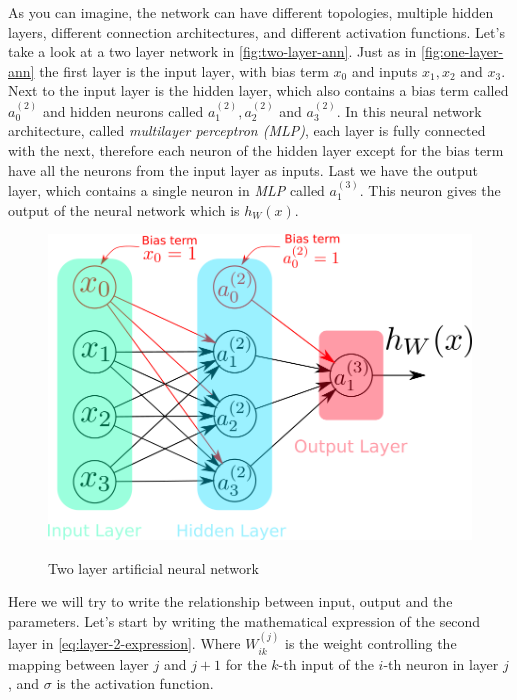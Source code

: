 As you can imagine, the network can have different topologies,
multiple hidden layers, different connection architectures, and
different activation functions. Let's take a look at a two layer
network in \autoref{fig:two-layer-ann}. Just as in
\autoref{fig:one-layer-ann} the first layer is the input layer, with
bias term $x_0$ and inputs $x_1, x_2$ and $x_3$. Next to the input
layer is the hidden layer, which also contains a bias term called
$a_0^{(2)}$ and hidden neurons called $a_1^{(2)}, a_2^{(2)}$ and
$a_3^{(2)}$. In this neural network architecture, called
\textit{multilayer perceptron (MLP)}, each layer is fully connected
with the next, therefore each neuron of the hidden layer except for
the bias term have all the neurons from the input layer as inputs.
Last we have the output layer, which contains a single neuron in
\textit{MLP} called $a_1^{(3)}$. This neuron gives the output of the
neural network which is $h_{W}(x)$.

\begin{figure}[bth]
  \myfloatalign
  {\includegraphics[width=1\linewidth]
    {gfx/two-layer-ann-model}}
  \caption{Two layer artificial neural network}
  \label{fig:two-layer-ann}
\end{figure}

Here we will try to write the relationship between input, output and
the parameters. Let's start by writing the mathematical expression of
the second layer in \autoref{eq:layer-2-expression}. Where
$W_{ik}^{(j)}$ is the weight controlling the mapping between layer $j$
and $j + 1$ for the $k$-th input of the $i$-th neuron in layer $j$,
and $\sigma$ is the activation function.

